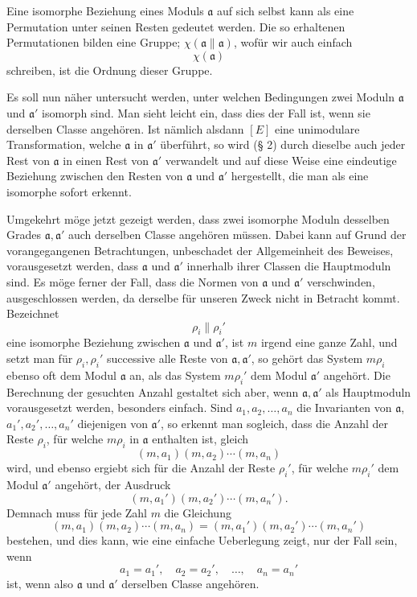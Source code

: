 Eine isomorphe Beziehung eines Moduls $\mathfrak a$ auf sich selbst kann als eine Permutation unter seinen Resten gedeutet werden. Die so erhaltenen Permutationen bilden eine Gruppe; $\chi(\mathfrak a\parallel\mathfrak a)$, wofür wir auch einfach
\[
 \chi(\mathfrak a)
\]
schreiben, ist die Ordnung dieser Gruppe.

Es soll nun näher untersucht werden, unter welchen Bedingungen zwei Moduln $\mathfrak a$ und $\mathfrak a'$ isomorph sind. Man sieht leicht ein, dass dies der Fall ist, wenn sie derselben Classe angehören. Ist nämlich alsdann $[E]$ eine unimodulare Transformation, welche $\mathfrak a$ in $\mathfrak a'$ überführt, so wird (§ 2) durch dieselbe auch jeder Rest von $\mathfrak a$ in einen Rest von $\mathfrak a'$ verwandelt und auf diese Weise eine eindeutige Beziehung zwischen den Resten von $\mathfrak a$ und $\mathfrak a'$ hergestellt, die man als eine isomorphe sofort erkennt.

Umgekehrt möge jetzt gezeigt werden, dass zwei isomorphe Moduln desselben Grades $\mathfrak a,\mathfrak a'$ auch derselben Classe angehören müssen. Dabei kann auf Grund der vorangegangenen Betrachtungen, unbeschadet der Allgemeinheit des Beweises, vorausgesetzt werden, dass $\mathfrak a$ und $\mathfrak a'$ innerhalb ihrer Classen die Hauptmoduln sind. Es möge ferner der Fall, dass die Normen von $\mathfrak a$ und $\mathfrak a'$ verschwinden, ausgeschlossen werden, da derselbe für unseren Zweck nicht in Betracht kommt. Bezeichnet
\[
 \rho_i\parallel \rho_i'
\]
eine isomorphe Beziehung zwischen $\mathfrak a$ und $\mathfrak a'$, ist $m$ irgend eine ganze Zahl, und setzt man für $\rho_i,\rho_i'$ successive alle Reste von $\mathfrak a,\mathfrak a'$, so gehört das System $m\rho_i$ ebenso oft dem Modul $\mathfrak a$ an, als das System $m\rho_i'$ dem Modul $\mathfrak a'$ angehört. Die Berechnung der gesuchten Anzahl gestaltet sich aber, wenn $\mathfrak a,\mathfrak a'$ als Hauptmoduln vorausgesetzt werden, besonders einfach. Sind $a_1,a_2,\ldots,a_n$ die Invarianten von $\mathfrak a$, $a_1',a_2',\ldots,a_n'$ diejenigen von $\mathfrak a'$, so erkennt man sogleich, dass die Anzahl der Reste $\rho_i$, für welche $m\rho_i$ in $\mathfrak a$ enthalten ist, gleich
\[
 (m,a_1)(m,a_2)\cdots(m,a_n)
\]
wird, und ebenso ergiebt sich für die Anzahl der Reste $\rho_i'$, für welche $m\rho_i'$ dem Modul $\mathfrak a'$ angehört, der Ausdruck
\[
 (m,a_1')(m,a_2')\cdots(m,a_n').
\]
Demnach muss für jede Zahl $m$ die Gleichung
\[
 (m,a_1)(m,a_2)\cdots(m,a_n)=(m,a_1')(m,a_2')\cdots(m,a_n')
\]
bestehen, und dies kann, wie eine einfache Ueberlegung zeigt, nur der Fall sein, wenn
\[
 a_1=a_1',\quad a_2=a_2',\quad\ldots,\quad a_n=a_n'
\]
ist, wenn also $\mathfrak a$ und $\mathfrak a'$ derselben Classe angehören.

